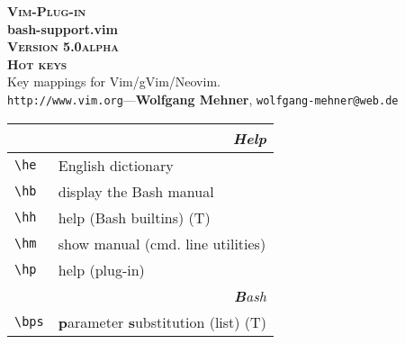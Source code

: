 \documentclass[oneside,11pt,landscape,DIV16]{scrartcl}
\newcommand{\Pluginversion}{5.0alpha}
\begin{document}
%

\begin{multicols}{3}
%
\begin{center}
%
\textbf{\textsc{\small{Vim-Plug-in}}}\\
\textbf{\LARGE{bash-support.vim}}\\
\textbf{\textsc{\small{Version \Pluginversion}}}\\
\vspace{1mm}%
\textbf{\textsc{\Huge{Hot keys}}}\\ 
\vspace{1mm}%
Key mappings for Vim/gVim/Neovim.\\
{\tiny  \texttt{http://www.vim.org}\hspace{1.5mm}---\hspace{1.5mm}\textbf{Wolfgang Mehner},  \texttt{wolfgang-mehner@web.de}}\\
\vspace{1.0mm}
%
\begin{tabular}[]{|p{11mm}|p{60mm}|}
\hline
\multicolumn{2}{|r|}{\textsl{\textbf{H}elp}}\\[1.0ex]
\hline \verb'\he'   & English dictionary                \\
\hline \verb'\hb'   & display the Bash manual           \\
\hline \verb'\hh'   & help (Bash builtins)              \hfill (T)\\
\hline \verb'\hm'   & show manual (cmd. line utilities) \\
\hline \verb'\hp'   & help (plug-in)                    \\
\hline
\hline 
\multicolumn{2}{|r|}{\textsl{\textbf{B}ash}}\\[1.0ex]
\hline \verb'\bps'   & \textbf{p}arameter \textbf{s}ubstitution (list) \hfill (T)\\

\end{tabular}
\end{center}
\end{multicols}
\end{document}
